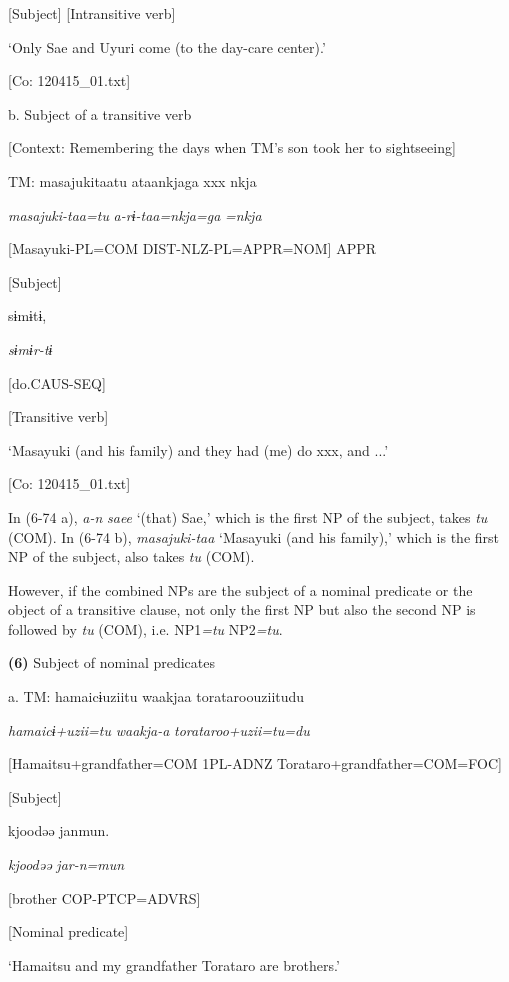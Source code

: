       [Subject]  [Intransitive verb]

      ‘Only Sae and Uyuri come (to the day-care center).’

      [Co: 120415\_01.txt]

  b.  Subject of a transitive verb

    [Context: Remembering the days when TM’s son took her to sightseeing]

    TM:  masajukitaatu  ataankjaga  xxx  nkja

      \textit{masajuki-taa=tu}  \textit{a-rɨ-taa=nkja=ga}    \textit{=nkja}

      [Masayuki-PL=COM  DIST-NLZ-PL=APPR=NOM]    APPR

      [Subject]    

      sɨmɨtɨ,

      \textit{sɨmɨr-tɨ}

      [do.CAUS-SEQ]

      [Transitive verb]

      ‘Masayuki (and his family) and they had (me) do xxx, and ...’

      [Co: 120415\_01.txt]

In (6-74 a), \textit{a-n} \textit{saee} ‘(that) Sae,’ which is the first NP of the subject, takes \textit{tu} (COM). In (6-74 b), \textit{masajuki-taa} ‘Masayuki (and his family),’ which is the first NP of the subject, also takes \textit{tu} (COM).

  However, if the combined NPs are the subject of a nominal predicate or the object of a transitive clause, not only the first NP but also the second NP is followed by \textit{tu} (COM), i.e. NP1\textit{=tu} NP2\textit{=tu}.

\textbf{(6)}  Subject of nominal predicates

  a.  TM:  hamaicɨuziitu  waakjaa  torataroouziitudu

      \textit{hamaicɨ+uzii=tu}  \textit{waakja-a}  \textit{torataroo+uzii=tu=du}

      [Hamaitsu+grandfather=COM  1PL-ADNZ  Torataro+grandfather=COM=FOC]

      [Subject]

      kjoodəə  janmun.

      \textit{kjoodəə}  \textit{jar-n=mun}

      [brother  COP-PTCP=ADVRS]

      [Nominal predicate]

      ‘Hamaitsu and my grandfather Torataro are brothers.’

